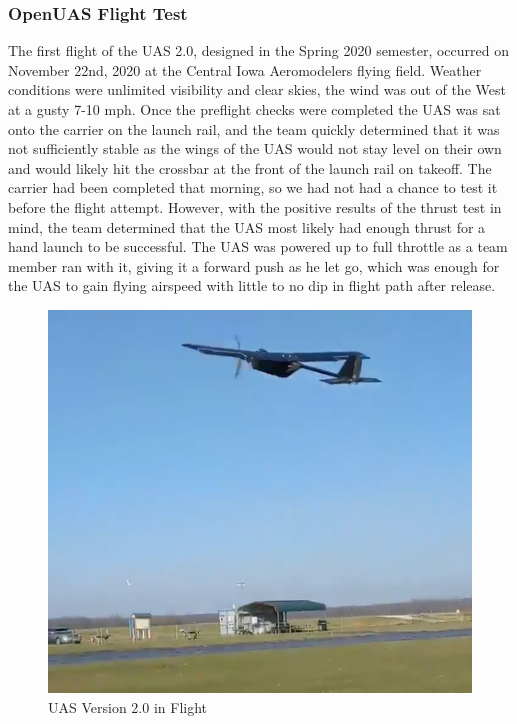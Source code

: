 \documentclass{article}
\begin{document}
\subsubsection{OpenUAS Flight Test}\label{UASflighttest}
The first flight of the UAS 2.0, designed in the Spring 2020 semester, occurred on November 22nd, 2020 at the Central Iowa Aeromodelers flying field. Weather conditions were unlimited visibility and clear skies, the wind was out of the West at a gusty 7-10 mph. Once the preflight checks were completed the UAS was sat onto the carrier on the launch rail, and the team quickly determined that it was not sufficiently stable as the wings of the UAS would not stay level on their own and would likely hit the crossbar at the front of the launch rail on takeoff. The carrier had been completed that morning, so we had not had a chance to test it before the flight attempt. However, with the positive results of the thrust test in mind, the team determined that the UAS most likely had enough thrust for a hand launch to be successful. The UAS was powered up to full throttle as a team member ran with it, giving it a forward push as he let go, which was enough for the UAS to gain flying airspeed with little to no dip in flight path after release.
\begin{figure}[!h]
    \centering
    \includegraphics[width=0.5\linewidth]{Images/UAS1.PNG}
    \caption{UAS Version 2.0 in Flight}
    \label{fig:UASflight}
\end{figure}
\end{document}
